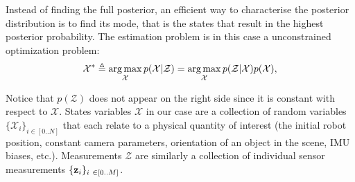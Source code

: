 Instead of finding the full posterior, an efficient way to characterise the posterior distribution is to find its mode, that is the states that 
result in the highest posterior probability. The estimation problem is in this case a unconstrained optimization problem:
%
\begin{equation}
    \label{eq:MAP_pbe}
    \mathcal{X}^* \triangleq \operatorname*{arg\,max}_{\mathcal{X}} p(\mathcal{X} | \mathcal{Z}) = \operatorname*{arg\,max}_{\mathcal{X}} p(\mathcal{Z} | \mathcal{X}) p(\mathcal{X}),
\end{equation}
%

Notice that $p(\mathcal{Z})$ does not appear on the right side since it is constant with respect to $\mathcal{X}$.
States variables $\mathcal{X}$ in our case are a collection of random variables $\{\mathcal{X}_i\}_{i \in [0..N]}$ that each relate to a physical quantity of 
interest (\eg the initial robot position, constant camera parameters, orientation of an object in the scene, IMU biases, etc.). Measurements $\mathcal{Z}$ are 
similarly a collection of individual sensor measurements $\{\bfz_i\}_{i \in [0..M]}$.

